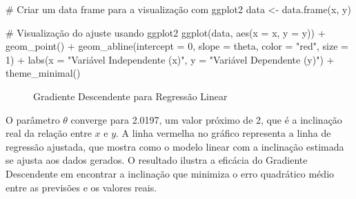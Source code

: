\documentclass[
  a4paperpaper,
]{article}
\newenvironment{Shaded}{\begin{snugshade}}{\end{snugshade}}
\newcommand{\AttributeTok}[1]{\textcolor[rgb]{0.40,0.45,0.13}{#1}}
\newcommand{\CommentTok}[1]{\textcolor[rgb]{0.37,0.37,0.37}{#1}}
\newcommand{\DecValTok}[1]{\textcolor[rgb]{0.68,0.00,0.00}{#1}}
\newcommand{\FunctionTok}[1]{\textcolor[rgb]{0.28,0.35,0.67}{#1}}
\newcommand{\NormalTok}[1]{\textcolor[rgb]{0.00,0.23,0.31}{#1}}
\newcommand{\OtherTok}[1]{\textcolor[rgb]{0.00,0.23,0.31}{#1}}
\newcommand{\SpecialCharTok}[1]{\textcolor[rgb]{0.37,0.37,0.37}{#1}}
\newcommand{\StringTok}[1]{\textcolor[rgb]{0.13,0.47,0.30}{#1}}
\begin{document}
\begin{Shaded}
\begin{Highlighting}[]
\CommentTok{\# Criar um data frame para a visualização com ggplot2}
\NormalTok{data }\OtherTok{\textless{}{-}} \FunctionTok{data.frame}\NormalTok{(x, y)}

\CommentTok{\# Visualização do ajuste usando ggplot2}
\FunctionTok{ggplot}\NormalTok{(data, }\FunctionTok{aes}\NormalTok{(}\AttributeTok{x =}\NormalTok{ x, }\AttributeTok{y =}\NormalTok{ y)) }\SpecialCharTok{+}
  \FunctionTok{geom\_point}\NormalTok{() }\SpecialCharTok{+}  \FunctionTok{geom\_abline}\NormalTok{(}\AttributeTok{intercept =} \DecValTok{0}\NormalTok{, }\AttributeTok{slope =}\NormalTok{ theta, }\AttributeTok{color =} \StringTok{"red"}\NormalTok{, }\AttributeTok{size =} \DecValTok{1}\NormalTok{) }\SpecialCharTok{+}  \FunctionTok{labs}\NormalTok{(}\AttributeTok{x =} \StringTok{"Variável Independente (x)"}\NormalTok{, }
       \AttributeTok{y =} \StringTok{"Variável Dependente (y)"}\NormalTok{) }\SpecialCharTok{+}
  \FunctionTok{theme\_minimal}\NormalTok{()}
\end{Highlighting}
\end{Shaded}

\begin{figure}[H]


\caption{\label{fig-gradiente}Gradiente Descendente para Regressão
Linear}

\end{figure}%

O parâmetro \(\theta\) converge para 2.0197, um valor próximo de 2, que
é a inclinação real da relação entre \(x\) e \(y\). A linha vermelha no
gráfico representa a linha de regressão ajustada, que mostra como o
modelo linear com a inclinação estimada se ajusta aos dados gerados. O
resultado ilustra a eficácia do Gradiente Descendente em encontrar a
inclinação que minimiza o erro quadrático médio entre as previsões e os
valores reais.
\end{document}
